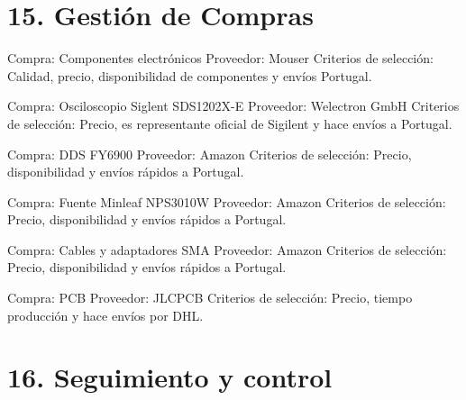 \documentclass[11pt]{charter}
\begin{document}
\section{15. Gestión de Compras}
\label{sec:compras}
Compra: Componentes electrónicos
Proveedor: Mouser
Criterios de selección: Calidad, precio, disponibilidad de componentes y envíos Portugal.

Compra: Osciloscopio Siglent SDS1202X-E
Proveedor: Welectron GmbH
Criterios de selección: Precio, es representante oficial de Sigilent y hace envíos a Portugal.

Compra: DDS FY6900
Proveedor: Amazon
Criterios de selección: Precio, disponibilidad y envíos rápidos a Portugal.

Compra: Fuente Minleaf NPS3010W
Proveedor: Amazon
Criterios de selección: Precio, disponibilidad y envíos rápidos a Portugal.

Compra: Cables y adaptadores SMA
Proveedor: Amazon
Criterios de selección: Precio, disponibilidad y envíos rápidos a Portugal.

Compra: PCB
Proveedor: JLCPCB
Criterios de selección: Precio, tiempo producción y hace envíos por DHL.


\section{16. Seguimiento y control}
\label{sec:seguimiento}
\end{document}
